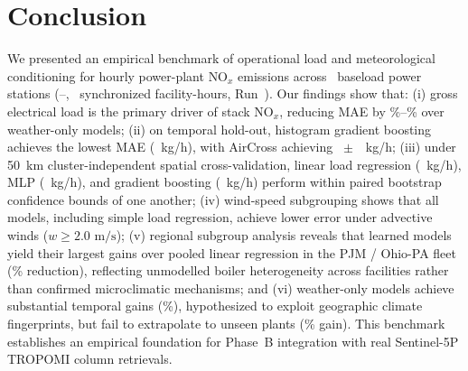 \documentclass[conference]{IEEEtran}
\begin{document}
\section{Conclusion}
\label{sec:conclusion}
We presented an empirical benchmark of operational load and meteorological conditioning for hourly power-plant $\text{NO}_x$ emissions across \NFacilities~baseload power stations (\YearFirst--\YearLast, \NFacilityHours~synchronized facility-hours, Run~\RunID). Our findings show that: (i) gross electrical load is the primary driver of stack $\text{NO}_x$, reducing MAE by \TempLoadGainPct\%--\SpatLoadGainPct\% over weather-only models; (ii) on temporal hold-out, histogram gradient boosting achieves the lowest MAE (\TempGBMAE~kg/h), with AirCross achieving \TempAirCrossMAE~$\pm$~\TempAirCrossMAEsd~kg/h; (iii) under 50~km cluster-independent spatial cross-validation, linear load regression (\SpatLoadRegMAE~kg/h), MLP (\SpatMLPMAE~kg/h), and gradient boosting (\SpatGBMAE~kg/h) perform within paired bootstrap confidence bounds of one another; (iv) wind-speed subgrouping shows that all models, including simple load regression, achieve lower error under advective winds ($w \ge 2.0\text{ m/s}$); (v) regional subgroup analysis reveals that learned models yield their largest gains over pooled linear regression in the PJM / Ohio-PA fleet (\RegimeAirCrossMidwestVsLoadRegPct\% reduction), reflecting unmodelled boiler heterogeneity across facilities rather than confirmed microclimatic mechanisms; and (vi) weather-only models achieve substantial temporal gains (\TempWeatherOnlyVsGlobalPct\%), hypothesized to exploit geographic climate fingerprints, but fail to extrapolate to unseen plants (\SpatWeatherOnlyVsGlobalPct\% gain). This benchmark establishes an empirical foundation for Phase~B integration with real Sentinel-5P TROPOMI column retrievals.



\end{document}

